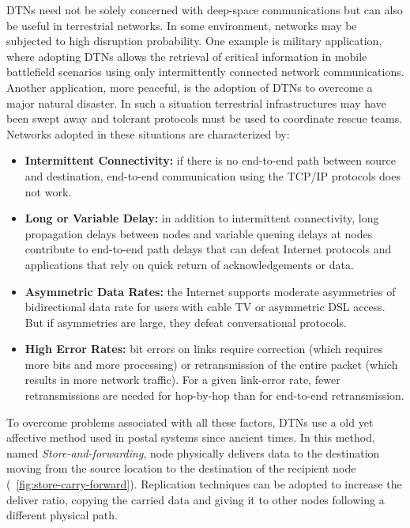 DTNs need not be solely concerned with deep-space communications but can also be useful in terrestrial networks. In some environment, networks may be subjected to high disruption probability. One example is military application, where adopting DTNs allows the retrieval of critical information in mobile battlefield scenarios using only intermittently connected network communications. Another application, more peaceful, is the adoption of DTNs to overcome a major natural disaster. In such a situation terrestrial infrastructures may have been swept away and tolerant protocols must be used to coordinate rescue teams.  
\\
Networks adopted in these situations are characterized by:
\begin{itemize}
\item \textbf{Intermittent Connectivity:} if there is no end-to-end path between source and destination, end-to-end communication using the TCP/IP protocols does not work.
\item \textbf{Long or Variable Delay:} in addition to intermittent connectivity, long propagation delays between nodes and variable queuing delays at nodes contribute to end-to-end path delays that can defeat Internet protocols and applications that rely on quick return of acknowledgements or data.
\item \textbf{Asymmetric Data Rates:} the Internet supports moderate asymmetries of bidirectional data rate for users with cable TV or asymmetric DSL access. But if asymmetries are large, they defeat conversational protocols.
\item \textbf{High Error Rates:} bit errors on links require correction (which requires more bits and more processing) or retransmission of the entire packet (which results in more network traffic). For a given link-error rate, fewer retransmissions are needed for hop-by-hop than for end-to-end retransmission.
\end{itemize}

To overcome problems associated with all these factors, DTNs use a old yet affective method used in postal systems since ancient times. In this method, named \textit{Store-and-forwarding}, node physically delivers data to the destination moving from the source location to the destination of the recipient node (\figurename~\ref{fig:store-carry-forward}). Replication techniques can be adopted to increase the deliver ratio, copying the carried data and giving it to other nodes following a different physical path.

